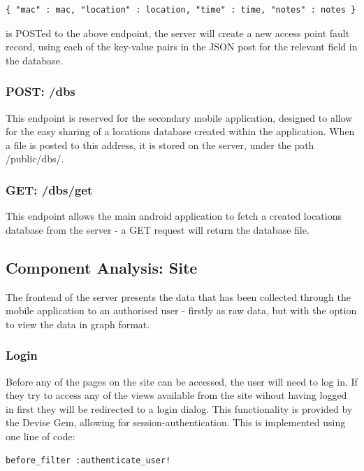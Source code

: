 \documentclass[11pt]{informatics-report}
\begin{document}
\begin{verbatim}
{ "mac" : mac, "location" : location, "time" : time, "notes" : notes }
\end{verbatim}
is POSTed to the above endpoint, the server will create a new access point fault record, using each of the key-value pairs in the JSON post for the relevant field in the database.

\subsubsection{POST: /dbs}

This endpoint is reserved for the secondary mobile application, designed to allow for the easy sharing of a locations database created within the application. When a file is posted to this address, it is stored on the server, under the path /public/dbs/.

\subsubsection{GET: /dbs/get}

This endpoint allows the main android application to fetch a created locations database from the server - a GET request will return the database file.

\subsection{Component Analysis: Site}

The frontend of the server presents the data that has been collected through the mobile application to an authorised user - firstly as raw data, but with the option to view the data in graph format. 

\subsubsection{Login}

Before any of the pages on the site can be accessed, the user will need to log in. If they try to access any of the views available from the site wihout having logged in first they will be redirected to a login dialog. This functionality is provided by the Devise Gem, allowing for session-authentication. This is implemented using one line of code:

\begin{verbatim}
before_filter :authenticate_user!
\end{verbatim}
\end{document}
